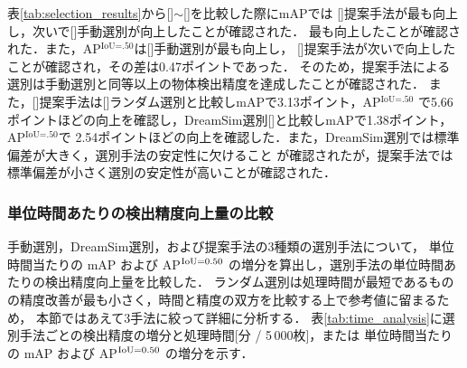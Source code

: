 \documentclass[Japanese]{dicomopapers}
\begin{document}
    \begin{table}[tb]
      \centering
      \caption{各スコア計算によるYOLOv8検出精度}
      \label{tab:selection_results}
    \end{table}
    \setlength{\textfloatsep}{8pt}
    表\ref{tab:selection_results}から[]$\sim$[]を比較した際にmAPでは
    []提案手法が最も向上し，次いで[]手動選別が向上したことが確認された．
    最も向上したことが確認された．また，AP${}^\text{IoU=.50}$は[]手動選別が最も向上し，
    []提案手法が次いで向上したことが確認され，その差は0.47ポイントであった．
    そのため，提案手法による選別は手動選別と同等以上の物体検出精度を達成したことが確認された．
    また，[]提案手法は[]ランダム選別と比較しmAPで3.13ポイント，AP${}^\text{IoU=.50}$
    で5.66ポイントほどの向上を確認し，DreamSim選別[]と比較しmAPで1.38ポイント，AP${}^\text{IoU=.50}$で
    2.54ポイントほどの向上を確認した．また，DreamSim選別では標準偏差が大きく，選別手法の安定性に欠けること
    が確認されたが，提案手法では標準偏差が小さく選別の安定性が高いことが確認された．
  \subsubsection{単位時間あたりの検出精度向上量の比較}
  
  手動選別，DreamSim選別，および提案手法の3種類の選別手法について，  
  単位時間当たりの mAP および AP${}^{\rm IoU=0.50}$ の増分を算出し，選別手法の単位時間あたりの検出精度向上量を比較した．
  ランダム選別は処理時間が最短であるものの精度改善が最も小さく，時間と精度の双方を比較する上で参考値に留まるため，  
  本節ではあえて3手法に絞って詳細に分析する．
  表\ref{tab:time_analysis}に選別手法ごとの検出精度の増分と処理時間[分 / 5\,000枚]，または
  単位時間当たりの mAP および AP${}^{\rm IoU=0.50}$ の増分を示す．
\end{document}
